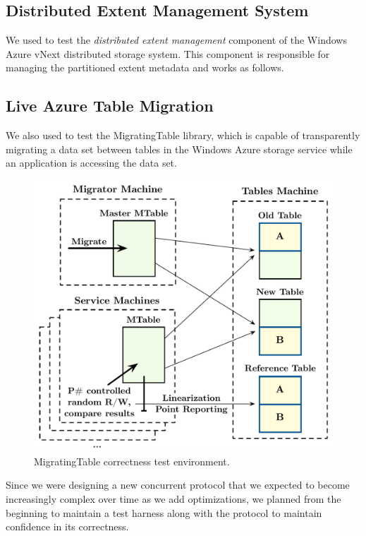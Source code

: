 \subsection{Distributed Extent Management System}
\label{sec:cases:azurestore}

We used \psharp to test the \emph{distributed extent management} component of the Windows Azure vNext distributed storage system. This component is responsible for managing the partitioned extent metadata and works as follows.

\subsection{Live Azure Table Migration}

We also used \psharp to test the MigratingTable library, which is capable of transparently migrating a data set between tables in the Windows Azure storage service while an application is accessing the data set.

\begin{figure}[t]
\centering
\includegraphics[width=\linewidth]{img/mocked_migration}
\caption{MigratingTable \psharp correctness test environment.}
\label{fig:mockedmigration}
\end{figure}

Since we were designing a new concurrent protocol that we expected to become increasingly complex over time as we add optimizations, we planned from the beginning to maintain a \psharp test harness along with the protocol to maintain confidence in its correctness.

